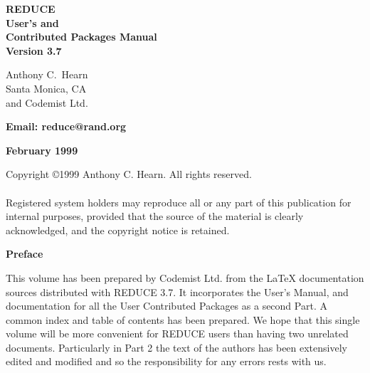 \documentclass[11pt,letterpaper]{book}
\newcommand{\REDUCE}{REDUCE}
\begin{document}
\pagestyle{empty}

\vspace*{2.0in}
\begin{center}

{\Huge\bf {\REDUCE}} \\ [0.2cm]
{\LARGE\bf User's and \\
  Contributed Packages Manual\vspace{0.4cm} \\
  Version 3.7}

\vspace{0.5in}\large\bf

Anthony C.\ Hearn \\
Santa Monica, CA \\
and Codemist Ltd.

\vspace{0.1in}

\bf Email: reduce@rand.org

\vspace{0.5in}

\large\bf February 1999

\end{center}

\newpage
\vspace*{3.0in}
\noindent Copyright \copyright 1999 Anthony C. Hearn.  All rights reserved. \\
\mbox{}\\
%
\noindent Registered system holders may reproduce all or any part of this
publication for internal purposes, provided that the source of the
material is clearly acknowledged, and the copyright notice is retained.

\newpage

\pagestyle{headings}

\centerline{\bf \large Preface}

This volume has been prepared by Codemist Ltd. from the {\LaTeX}
documentation sources distributed with {\REDUCE} 3.7.  It incorporates
the User's Manual, and documentation for all the User Contributed
Packages as a second Part.  A common index and table of contents has been
prepared.  We hope that this single volume will be more convenient for
{\REDUCE} users than having two unrelated documents.  Particularly in
Part 2 the text of the authors has been extensively edited and
modified and so the responsibility for any errors rests with us.
\end{document}
